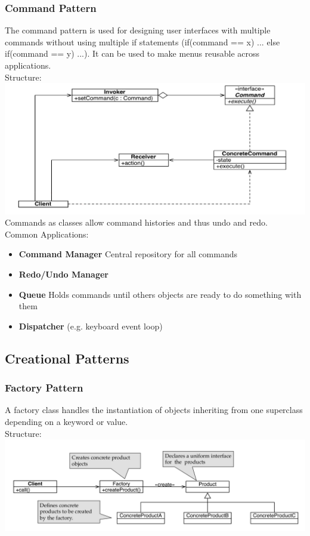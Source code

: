 \subsubsection{Command Pattern}
The command pattern is used for designing user interfaces with multiple commands without using multiple if statements (if(command == x) {...} else if(command == y) ...).
It can be used to make menus reusable across applications.\\
Structure:\\
\includegraphics[width=\linewidth]{images/pattern_command.png}
Commands as classes allow command histories and thus undo and redo.\\
Common Applications:
\begin{itemize}
  \item \textbf{Command Manager} Central repository for all commands
  \item \textbf{Redo/Undo Manager}
  \item \textbf{Queue} Holds commands until others objects are ready to do something with them
  \item \textbf{Dispatcher} (e.g. keyboard event loop)
\end{itemize}
\newpage


\subsection{Creational Patterns}

\subsubsection{Factory Pattern}
A factory class handles the instantiation of objects inheriting from one superclass depending on a keyword or value.\\
Structure:\\
\includegraphics[width=\linewidth]{images/pattern_factory.png}
\newpage

